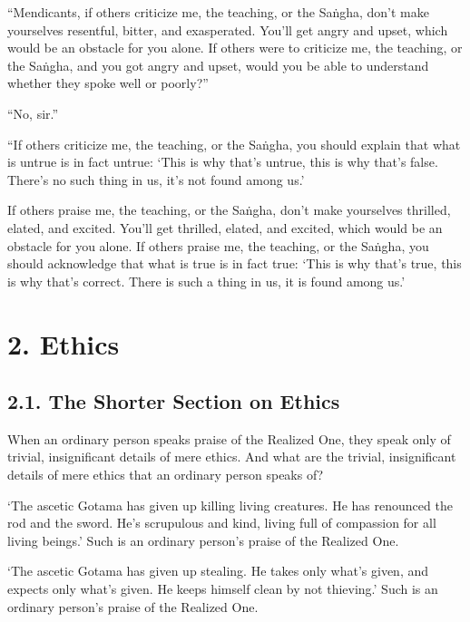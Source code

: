 \documentclass[12pt,openany]{book}%
\begin{document}
“Mendicants, if others criticize me, the teaching, or the \textsanskrit{Saṅgha}, don’t make yourselves resentful, bitter, and exasperated. You’ll get angry and upset, which would be an obstacle for you alone. If others were to criticize me, the teaching, or the \textsanskrit{Saṅgha}, and you got angry and upset, would you be able to understand whether they spoke well or poorly?” 

“No, sir.” 

“If others criticize me, the teaching, or the \textsanskrit{Saṅgha}, you should explain that what is untrue is in fact untrue: ‘This is why that’s untrue, this is why that’s false. There’s no such thing in us, it’s not found among us.’ 

If others praise me, the teaching, or the \textsanskrit{Saṅgha}, don’t make yourselves thrilled, elated, and excited. You’ll get thrilled, elated, and excited, which would be an obstacle for you alone. If others praise me, the teaching, or the \textsanskrit{Saṅgha}, you should acknowledge that what is true is in fact true: ‘This is why that’s true, this is why that’s correct. There is such a thing in us, it is found among us.’ 

\section*{2. Ethics }

\subsection*{2.1. The Shorter Section on Ethics }

When an ordinary person speaks praise of the Realized One, they speak only of trivial, insignificant details of mere ethics. And what are the trivial, insignificant details of mere ethics that an ordinary person speaks of? 

‘The ascetic Gotama has given up killing living creatures. He has renounced the rod and the sword. He’s scrupulous and kind, living full of compassion for all living beings.’ Such is an ordinary person’s praise of the Realized One. 

‘The ascetic Gotama has given up stealing. He takes only what’s given, and expects only what’s given. He keeps himself clean by not thieving.’ Such is an ordinary person’s praise of the Realized One. 
\end{document}
